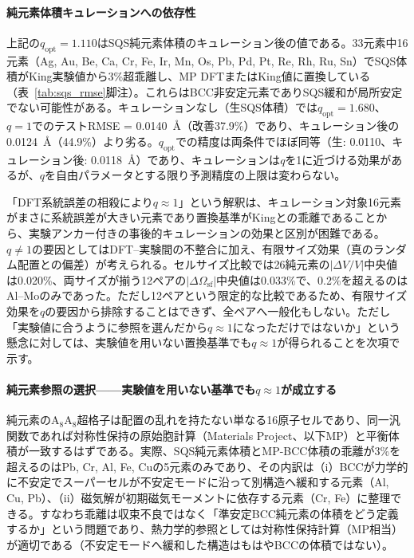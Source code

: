 \documentclass[5p,10pt]{elsarticle}
\begin{document}
\paragraph{純元素体積キュレーションへの依存性}
上記の$q_\text{opt} = 1.110$はSQS純元素体積のキュレーション後の値である。33元素中16元素（Ag, Au, Be, Ca, Cr, Fe, Ir, Mn, Os, Pb, Pd, Pt, Re, Rh, Ru, Sn）でSQS体積がKing実験値から3\%超乖離し、MP DFTまたはKing値に置換している（表~\ref{tab:sqs_rmse}脚注）。これらはBCC非安定元素でありSQS緩和が局所安定でない可能性がある。キュレーションなし（生SQS体積）では$q_\text{opt} = 1.680$、$q = 1$でのテストRMSE = 0.0140~\AA{}（改善37.9\%）であり、キュレーション後の0.0124~\AA{}（44.9\%）より劣る。$q_\text{opt}$での精度は両条件でほぼ同等（生: 0.0110、キュレーション後: 0.0118~\AA{}）であり、キュレーションは$q$を1に近づける効果があるが、$q$を自由パラメータとする限り予測精度の上限は変わらない。

「DFT系統誤差の相殺により$q \approx 1$」という解釈は、キュレーション対象16元素がまさに系統誤差が大きい元素であり置換基準がKingとの乖離であることから、実験アンカー付きの事後的キュレーションの効果と区別が困難である。$q \neq 1$の要因としてはDFT--実験間の不整合に加え、有限サイズ効果（真のランダム配置との偏差）が考えられる。セルサイズ比較では26純元素の$\left|\Delta V/V\right|$中央値は0.020\%、両サイズが揃う12ペアの$\left|\Delta\Omega_\text{sf}\right|$中央値は0.033\%で、0.2\%を超えるのはAl--Moのみであった。ただし12ペアという限定的な比較であるため、有限サイズ効果を$q$の要因から排除することはできず、全ペアへ一般化もしない。ただし「実験値に合うように参照を選んだから$q \approx 1$になっただけではないか」という懸念に対しては、実験値を用いない置換基準でも$q \approx 1$が得られることを次項で示す。

\paragraph{純元素参照の選択——実験値を用いない基準でも$q \approx 1$が成立する}
純元素のA$_8$A$_8$超格子は配置の乱れを持たない単なる16原子セルであり、同一汎関数であれば対称性保持の原始胞計算（Materials Project、以下MP）と平衡体積が一致するはずである。実際、SQS純元素体積とMP-BCC体積の乖離が3\%を超えるのはPb, Cr, Al, Fe, Cuの5元素のみであり、その内訳は（i）BCCが力学的に不安定でスーパーセルが不安定モードに沿って別構造へ緩和する元素（Al, Cu, Pb）、（ii）磁気解が初期磁気モーメントに依存する元素（Cr, Fe）に整理できる。すなわち乖離は収束不良ではなく「準安定BCC純元素の体積をどう定義するか」という問題であり、熱力学的参照としては対称性保持計算（MP相当）が適切である（不安定モードへ緩和した構造はもはやBCCの体積ではない）。
\end{document}
